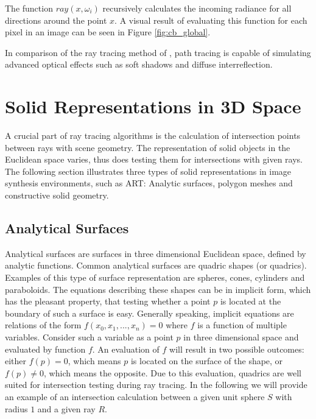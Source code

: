 The function $ray(x, \omega_{i})$ recursively calculates the incoming radiance for all directions around the point $x$. A visual result of evaluating this function for each pixel in an image can be seen in Figure \ref{fig:cb_global}.

In comparison of the ray tracing method of \cite{whitted1979improved}, path tracing is capable of simulating advanced optical effects such as soft shadows and diffuse interreflection.

\section{Solid Representations in 3D Space}

A crucial part of ray tracing algorithms is the calculation of intersection points between rays with scene geometry.
The representation of solid objects in the Euclidean space varies, thus does testing them for intersections with given rays. The following section illustrates three types of solid representations in image synthesis environments, such as ART: Analytic surfaces, polygon meshes and constructive solid geometry.

\subsection{Analytical Surfaces}
\label{sec:quadrics}
Analytical surfaces are surfaces in three dimensional Euclidean space, defined by analytic functions. Common analytical surfaces are quadric shapes (or quadrics). Examples of this type of surface representation are spheres, cones, cylinders and paraboloids. The equations describing these shapes can be in implicit form, which has the pleasant property, that testing whether a point $p$ is located at the boundary of such a surface is easy. Generally speaking, implicit equations are relations of the form  $f(x_{0}, x_{1}, ..., x_{n}) = 0$ where $f$ is a function of multiple variables. Consider such a variable as a point $p$ in three dimensional space and evaluated by function $f$. An evaluation of $f$ will result in two possible outcomes: either $f(p) = 0$, which means $p$ is located on the surface of the shape, or  $f(p) \ne 0$, which means the opposite.
Due to this evaluation, quadrics are well suited for intersection testing during ray tracing.
In the following we will provide an example of an intersection calculation between a given unit sphere $S$ with radius $1$ and a given ray $R$. 

